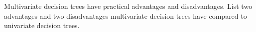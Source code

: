 \item {} Multivariate decision trees have practical advantages and disadvantages. List two advantages and two disadvantages multivariate decision trees have compared to univariate decision trees.